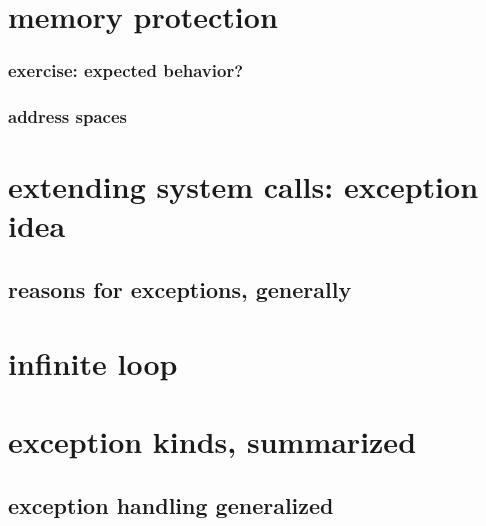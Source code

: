 \section{memory protection}

\subsubsection{exercise: expected behavior?}


%

\subsubsection{address spaces}


\section{extending system calls: exception idea}


\subsection{reasons for exceptions, generally}


\section{infinite loop}


\section{exception kinds, summarized}


\subsection{exception handling generalized}


